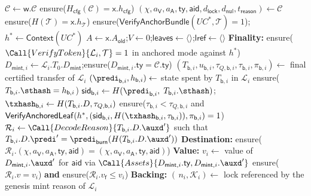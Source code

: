 \begin{algorithm}[!htbp]
\caption{Batch Return Relation $\mathfrak{R}(\mathsf{x},\mathsf{w})$}\label{alg:bridge-relation}
\begin{algorithmic}[0]
  \State $\mathcal{C} \gets \mathsf{w}.\mathcal{C}$
  \State ensure($H_\mathsf{cfg}(\mathcal{C}) = \mathsf{x}.h_\mathsf{cfg}$)
  \State $(\chi,a_\mathsf{V},a_\mathsf{A},\mathsf{ty},\mathsf{aid},d_\mathsf{lock},d_\mathsf{nul},t_\mathsf{reason}) \gets \mathcal{C}$
  \State ensure($H(\mathcal{T}) = \mathsf{x}.h_\mathcal{T}$)
  \State ensure($\mathsf{VerifyAnchorBundle}(UC^*,\mathcal{T}) = 1$);\quad $h^* \gets \mathsf{Context}(UC^*)$
  \State $A \gets \mathsf{x}.A_\mathsf{old}$;\quad $V \gets 0$;\quad $\mathsf{leaves} \gets \langle\rangle$;\quad $\mathsf{lref} \gets \langle\rangle$
    \State \textbf{Finality:} ensure($\Call{VerifyToken}{\mathcal{L}_i,\mathcal{T}} = 1$ in anchored mode against $h^*$)
    \State $D_{\mathsf{mint},i} \gets \mathcal{L}_i.T_0.D_\mathsf{mint}$;\quad ensure($D_{\mathsf{mint},i}.\mathsf{ty} = \mathcal{C}.\mathsf{ty}$)
    \State $(T_{\mathsf{b},i},u_{\mathsf{b},i},\tau_{Q,\mathsf{b},i},\tau_{\mathsf{b},i},\pi_{\mathsf{b},i}) \gets$ final certified transfer of $\mathcal{L}_i$
    \State $(\predi_{\mathsf{b},i},h_{\mathsf{b},i}) \gets$ state spent by $T_{\mathsf{b},i}$ in $\mathcal{L}_i$
    \State ensure($T_{\mathsf{b},i}.\sthash = h_{\mathsf{b},i}$)
    \State $\mathsf{sid}_{\mathsf{b},i} \gets H(\predi_{\mathsf{b},i},\;T_{\mathsf{b},i}.\sthash)$;\quad $\txhash_{\mathsf{b},i} \gets H(T_{\mathsf{b},i}.D,\tau_{Q,\mathsf{b},i})$
    \State ensure($\tau_{\mathsf{b},i}<\tau_{Q,\mathsf{b},i}$ and $\mathsf{VerifyAnchoredLeaf}(h^*,(\mathsf{sid}_{\mathsf{b},i},H(\txhash_{\mathsf{b},i},\tau_{\mathsf{b},i})),\pi_{\mathsf{b},i})=1$)
    \State $\mathcal{R}_i \gets \Call{DecodeReason}{T_{\mathsf{b},i}.D.\auxd'}$ such that $T_{\mathsf{b},i}.D.\predi' = \predi_\mathsf{burn}(H(T_{\mathsf{b},i}.D.\auxd'))$
    \State \textbf{Destination:} ensure($\mathcal{R}_i.(\chi,a_\mathsf{V},a_\mathsf{A},\mathsf{ty},\mathsf{aid}) = (\chi,a_\mathsf{V},a_\mathsf{A},\mathsf{ty},\mathsf{aid})$)
    \State \textbf{Value:} $v_i \gets$ value of $D_{\mathsf{mint},i}.\auxd'$ for $\mathsf{aid}$ via $\Call{Assets}{D_{\mathsf{mint},i}.\mathsf{ty},D_{\mathsf{mint},i}.\auxd'}$
    \State ensure($\mathcal{R}_i.v = v_i$) \textbf{and} ensure($\mathcal{R}_i.v_\mathsf{f} \le v_i$)
    \State \textbf{Backing:} $(\,n_i,\mathcal{K}_i) \gets$ lock referenced by the genesis mint reason of $\mathcal{L}_i$

\end{algorithmic}
\end{algorithm}
